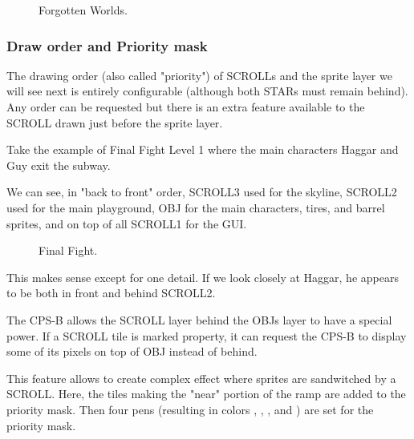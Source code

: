 \vfill
\begin{figure}[!b]
 \caption*{Forgotten Worlds.}%
 \end{figure}%
\pagebreak









\subsubsection{Draw order and Priority mask}


The drawing order (also called "priority") of SCROLLs and the sprite layer we will see next is entirely configurable (although both STARs must remain behind). Any order can be requested but there is an extra feature available to the SCROLL drawn just before the sprite layer.

Take the example of Final Fight Level 1 where the main characters Haggar and Guy exit the subway. 

We can see, in "back to front" order,   SCROLL3 used for the skyline,  SCROLL2 used for the main playground,  OBJ for the main characters, tires, and barrel sprites, and on top of all  SCROLL1 for the GUI.


\vfill
\begin{figure}[!b]
 \caption*{Final Fight.}%
 \end{figure}%
\pagebreak


This makes sense except for one detail. If we look closely at Haggar, he appears to be both in front and behind SCROLL2.

The CPS-B allows the SCROLL layer behind the OBJs layer to have a special power. If a SCROLL tile is marked property, it can request the CPS-B to display some of its pixels on top of OBJ instead of behind.

This feature allows to create complex effect where sprites are sandwitched by a SCROLL. Here, the tiles making the "near" portion of the ramp are added to the priority mask. Then four pens (resulting in colors  ,  ,  , and ) are set for the priority mask.

